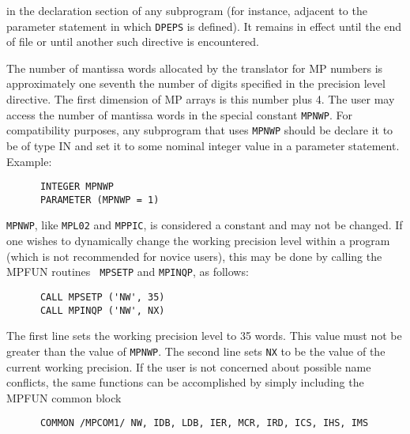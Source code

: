\noindent
in the declaration section of any subprogram (for instance, adjacent
to the parameter statement in which {\tt DPEPS} is defined).  It
remains in effect until the end of file or until another such
directive is encountered.

The number of mantissa words allocated by the translator for MP
numbers is approximately one seventh the number of digits specified in
the precision level directive.  The first dimension of MP arrays is
this number plus 4.  The user may access the number of mantissa words
in the special constant {\tt MPNWP}.  For compatibility purposes, any
subprogram that uses {\tt MPNWP} should be declare it to be of type IN
and set it to some nominal integer value in a parameter statement.
Example:

\begin{tt} \begin{small} \begin{verbatim} 
      INTEGER MPNWP
      PARAMETER (MPNWP = 1)
\end{verbatim} \end{small} \end{tt}
 
{\tt MPNWP}, like {\tt MPL02} and {\tt MPPIC}, is considered a
constant and may not be changed.  If one wishes to dynamically change
the working precision level within a program (which is not recommended
for novice users), this may be done by calling the MPFUN routines {\tt
MPSETP} and {\tt MPINQP}, as follows:

\begin{tt} \begin{small} \begin{verbatim}
      CALL MPSETP ('NW', 35)
      CALL MPINQP ('NW', NX)
\end{verbatim} \end{small} \end{tt}
 
\noindent
The first line sets the working precision level to 35 words.  This
value must not be greater than the value of {\tt MPNWP}.  The second
line sets {\tt NX} to be the value of the current working precision.
If the user is not concerned about possible name conflicts, the same
functions can be accomplished by simply including the MPFUN common
block

\begin{tt} \begin{small} \begin{verbatim}
      COMMON /MPCOM1/ NW, IDB, LDB, IER, MCR, IRD, ICS, IHS, IMS
\end{verbatim} \end{small} \end{tt}

